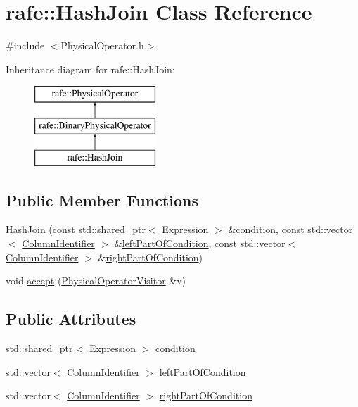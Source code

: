 \hypertarget{classrafe_1_1_hash_join}{\section{rafe\+:\+:Hash\+Join Class Reference}
\label{classrafe_1_1_hash_join}
}


{\ttfamily \#include $<$Physical\+Operator.\+h$>$}

Inheritance diagram for rafe\+:\+:Hash\+Join\+:\begin{figure}[H]
\begin{center}
\leavevmode
\includegraphics[height=3.000000cm]{classrafe_1_1_hash_join}
\end{center}
\end{figure}
\subsection*{Public Member Functions}
\begin{DoxyCompactItemize}
\item 
\hyperlink{classrafe_1_1_hash_join_a07a2174c405518eca64c4370a7741429}{Hash\+Join} (const std\+::shared\+\_\+ptr$<$ \hyperlink{classrafe_1_1_expression}{Expression} $>$ \&\hyperlink{classrafe_1_1_hash_join_a0642b38448cb547c6b6a118002bc0dd8}{condition}, const std\+::vector$<$ \hyperlink{classrafe_1_1_column_identifier}{Column\+Identifier} $>$ \&\hyperlink{classrafe_1_1_hash_join_a7cc0d8d90cd314e40a0cc467954c91d1}{left\+Part\+Of\+Condition}, const std\+::vector$<$ \hyperlink{classrafe_1_1_column_identifier}{Column\+Identifier} $>$ \&\hyperlink{classrafe_1_1_hash_join_a8d6f385e17aa74f96d4ca7e66f09fac8}{right\+Part\+Of\+Condition})
\item 
void \hyperlink{classrafe_1_1_hash_join_abd86be090582ddf7e87ac7d3dd2f60a7}{accept} (\hyperlink{classrafe_1_1_physical_operator_visitor}{Physical\+Operator\+Visitor} \&v)
\end{DoxyCompactItemize}
\subsection*{Public Attributes}
\begin{DoxyCompactItemize}
\item 
std\+::shared\+\_\+ptr$<$ \hyperlink{classrafe_1_1_expression}{Expression} $>$ \hyperlink{classrafe_1_1_hash_join_a0642b38448cb547c6b6a118002bc0dd8}{condition}
\item 
std\+::vector$<$ \hyperlink{classrafe_1_1_column_identifier}{Column\+Identifier} $>$ \hyperlink{classrafe_1_1_hash_join_a7cc0d8d90cd314e40a0cc467954c91d1}{left\+Part\+Of\+Condition}
\item 
std\+::vector$<$ \hyperlink{classrafe_1_1_column_identifier}{Column\+Identifier} $>$ \hyperlink{classrafe_1_1_hash_join_a8d6f385e17aa74f96d4ca7e66f09fac8}{right\+Part\+Of\+Condition}
\end{DoxyCompactItemize}


